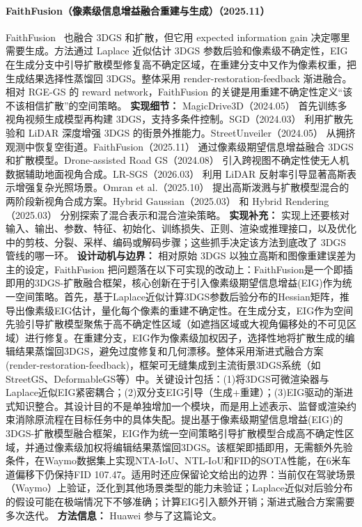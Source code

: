 \paragraph{FaithFusion（像素级信息增益融合重建与生成）（2025.11）}

FaithFusion~\cite{2511_21113} 也融合 3DGS 和扩散，但它用 expected information gain 决定哪里需要生成。方法通过 Laplace 近似估计 3DGS 参数后验和像素级不确定性，EIG 在生成分支中引导扩散模型修复高不确定区域，在重建分支中又作为像素权重，把生成结果选择性蒸馏回 3DGS。整体采用 render-restoration-feedback 渐进融合。相对 RGE-GS 的 reward network，FaithFusion 的关键是用重建不确定性定义“该不该相信扩散”的空间策略。
\textbf{实现细节：} MagicDrive3D（2024.05） 首先训练多视角视频生成模型再构建 3DGS，支持多条件控制。SGD（2024.03） 利用扩散先验和 LiDAR 深度增强 3DGS 的街景外推能力。StreetUnveiler（2024.05） 从拥挤观测中恢复空街道。FaithFusion（2025.11） 通过像素级期望信息增益融合 3DGS 和扩散模型。Drone-assisted Road GS（2024.08） 引入跨视图不确定性使无人机数据辅助地面视角合成。LR-SGS（2026.03） 利用 LiDAR 反射率引导显著高斯表示增强复杂光照场景。Omran et al.（2025.10） 提出高斯泼溅与扩散模型混合的两阶段新视角合成方案。Hybrid Gaussian（2025.03） 和 Hybrid Rendering（2025.03） 分别探索了混合表示和混合渲染策略。
\textbf{实现补充：} 实现上还要核对输入、输出、参数、特征、初始化、训练损失、正则、渲染或推理接口，以及优化中的剪枝、分裂、采样、编码或解码步骤；这些抓手决定该方法到底改了 3DGS 管线的哪一环。
\textbf{设计动机与边界：} 相对原始 3DGS 以独立高斯和图像重建误差为主的设定，FaithFusion 把问题落在以下可实现的改动上：FaithFusion是一个即插即用的3DGS-扩散融合框架，核心创新在于引入像素级期望信息增益(EIG)作为统一空间策略。首先，基于Laplace近似计算3DGS参数后验分布的Hessian矩阵，推导出像素级EIG估计，量化每个像素的重建不确定性。在生成分支，EIG作为空间先验引导扩散模型聚焦于高不确定性区域（如遮挡区域或大视角偏移处的不可见区域）进行修复。在重建分支，EIG作为像素级加权因子，选择性地将扩散生成的编辑结果蒸馏回3DGS，避免过度修复和几何漂移。整体采用渐进式融合方案(render-restoration-feedback)，框架可无缝集成到主流街景3DGS系统（如StreetGS、DeformableGS等）中。关键设计包括：(1)将3DGS可微渲染器与Laplace近似EIG紧密耦合；(2)双分支EIG引导（生成+重建）；(3)EIG驱动的渐进式知识整合。其设计目的不是单独增加一个模块，而是用上述表示、监督或渲染约束消除原流程在目标任务中的具体失配。提出基于像素级期望信息增益(EIG)的3DGS-扩散模型融合框架，EIG作为统一空间策略引导扩散模型合成高不确定性区域，并通过像素级加权将编辑结果蒸馏回3DGS。该框架即插即用，无需额外先验条件，在Waymo数据集上实现NTA-IoU、NTL-IoU和FID的SOTA性能，在6米车道偏移下仍保持FID 107.47。适用时还应保留论文给出的边界：当前仅在驾驶场景（Waymo）上验证，泛化到其他场景类型的能力未验证；Laplace近似对后验分布的假设可能在极端情况下不够准确；计算EIG引入额外开销；渐进式融合方案需要多次迭代。
\textbf{方法信息：} Huawei 参与了这篇论文。



